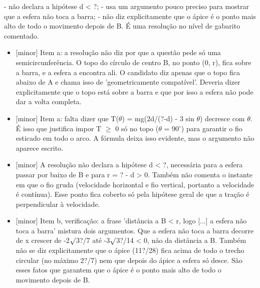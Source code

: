 \documentclass{article}%
\begin{document}
{-} não declara a hipótese d < ?;\newline%
{-} usa um argumento pouco preciso para mostrar que a esfera não toca a barra;\newline%
{-} não diz explicitamente que o ápice é o ponto mais alto de todo o movimento depois de B.\newline%
\newline%
É uma resolução no nível de gabarito comentado.%
\begin{itemize}%
\item%
{[}minor{]} Item a: a resolução não diz por que a questão pede só uma semicircunferência. O topo do círculo de centro B, no ponto (0, r), fica sobre a barra, e a esfera a encontra ali. O candidato diz apenas que o topo fica abaixo de A e chama isso de 'geometricamente compatível'. Deveria dizer explicitamente que o topo está sobre a barra e que por isso a esfera não pode dar a volta completa.%
\item%
{[}minor{]} Item a: falta dizer que T($\theta$) = mg(2d/(?-d) - 3 sin $\theta$) decresce com $\theta$. É isso que justifica impor T $\geq$ 0 só no topo ($\theta$ = 90$^\circ$) para garantir o fio esticado em todo o arco. A fórmula deixa isso evidente, mas o argumento não aparece escrito.%
\item%
{[}minor{]} A resolução não declara a hipótese d < ?, necessária para a esfera passar por baixo de B e para r = ? - d > 0. Também não comenta o instante em que o fio gruda (velocidade horizontal e fio vertical, portanto a velocidade é contínua). Esse ponto fica coberto só pela hipótese geral de que a tração é perpendicular à velocidade.%
\item%
{[}minor{]} Item b, verificação: a frase 'distância a B < r, logo {[}...{]} a esfera não toca a barra' mistura dois argumentos. Que a esfera não toca a barra decorre de x crescer de -2$\surd$3?/7 até -3$\surd$3?/14 < 0, não da distância a B. Também não se diz explicitamente que o ápice (11?/28) fica acima de todo o trecho circular (no máximo 2?/7) nem que depois do ápice a esfera só desce. São esses fatos que garantem que o ápice é o ponto mais alto de todo o movimento depois de B.%
\end{itemize}%
\end{document}
